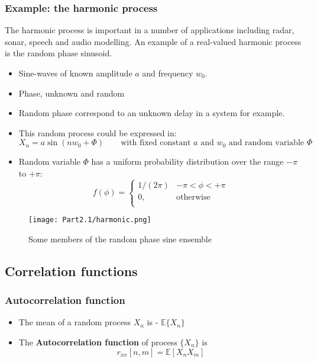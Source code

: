 \documentclass[12pt]{article}
\newcommand{\mexp}{\mathbb{E}}
\newcommand{\mexpproc}[1]{\mathbb{E}\{ #1\}}
\newcommand{\proc}[1]{\{ #1_n\}}
\newcommand{\autocox}{r_{xx}}
\begin{document}
\subsubsection{Example: the harmonic process}
The harmonic process is important in a number of applications including radar, sonar, speech and audio modelling. An example of a real-valued harmonic process is the random phase sinusoid.
\begin{itemize}
    \item Sine-waves of known amplitude $a$ and frequency $w_0$.
    \item Phase, unknown and random 
    \item Random phase correspond to an unknown delay in a system for example.
    \item This random process could be expressed in:
    \[
    X_n = a \sin(n w_0 + \Phi) \qquad \textrm{with fixed constant $a$ and $w_0$ and random variable $\Phi$} 
    \]
    \item Random variable $\Phi$ has a uniform probability distribution over the range $-\pi$ to $+\pi$:
    \[
    f(\phi) =\left \{\begin{array}{ll}
    
        1/(2\pi) & -\pi < \phi < +\pi  \\
        0, & \textrm{otherwise} \\
        
    \end{array}\right.
    \]
\end{itemize}
\begin{figure}[H]
    \centering
    \texttt{[image: Part2.1/harmonic.png]}
    \caption{Some members of the random phase sine ensemble}
\end{figure}
\subsection{Correlation functions }
\subsubsection{Autocorrelation function}
\begin{itemize}
    \item The mean of a random process ${X_n}$ is - $\mexpproc{X_n}$ 
    \item The \textbf{Autocorrelation function} of process $\proc{X}$ is 
    \[
    \autocox[n,m] = \mexp[X_nX_m]
    \]
\end{itemize}
\end{document}
